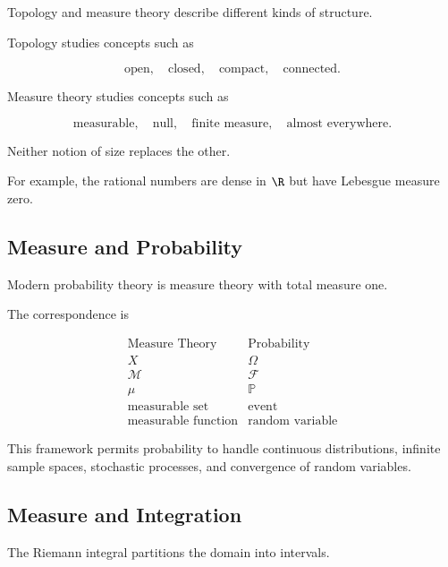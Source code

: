 Topology and measure theory describe different kinds of structure.

Topology studies concepts such as

\[
\boxed{
\text{open},
\quad
\text{closed},
\quad
\text{compact},
\quad
\text{connected}.
}
\]

Measure theory studies concepts such as

\[
\boxed{
\text{measurable},
\quad
\text{null},
\quad
\text{finite measure},
\quad
\text{almost everywhere}.
}
\]

Neither notion of size replaces the other.

For example, the rational numbers are dense in \(\R\) but have Lebesgue
measure zero.

\subsection{Measure and Probability}
\label{subsec:measure-and-probability}

Modern probability theory is measure theory with total measure one.

The correspondence is

\[
\boxed{
\begin{array}{c|c}
\text{Measure Theory} & \text{Probability}\\
\hline
X & \Omega\\
\mathcal{M} & \mathcal{F}\\
\mu & \mathbb{P}\\
\text{measurable set} & \text{event}\\
\text{measurable function} & \text{random variable}
\end{array}
}
\]

This framework permits probability to handle continuous distributions,
infinite sample spaces, stochastic processes, and convergence of random
variables.

\subsection{Measure and Integration}
\label{subsec:measure-and-integration}

The Riemann integral partitions the domain into intervals.

